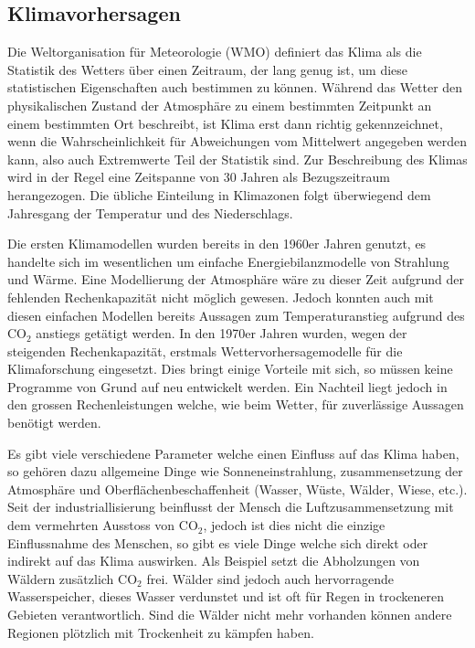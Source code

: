 \begin{refsection}
\subsection{Klimavorhersagen
\label{klima:subsection:entstehung}}
Die Weltorganisation für Meteorologie (WMO) definiert das Klima als die Statistik des Wetters über einen Zeitraum, der lang genug ist, um diese statistischen Eigenschaften auch bestimmen zu können. Während das Wetter den physikalischen Zustand der Atmosphäre zu einem bestimmten Zeitpunkt an einem bestimmten Ort beschreibt, ist Klima erst dann richtig gekennzeichnet, wenn die Wahrscheinlichkeit für Abweichungen vom Mittelwert angegeben werden kann, also auch Extremwerte Teil der Statistik sind. Zur Beschreibung des Klimas wird in der Regel eine Zeitspanne von 30 Jahren als Bezugszeitraum herangezogen. Die übliche Einteilung in Klimazonen folgt überwiegend dem Jahresgang der Temperatur und des Niederschlags. \cite{klima:maxplanck}

Die ersten Klimamodellen wurden bereits in den 1960er Jahren genutzt, es handelte sich im wesentlichen um einfache Energiebilanzmodelle von Strahlung und Wärme. Eine Modellierung der Atmosphäre wäre zu dieser Zeit aufgrund der fehlenden Rechenkapazität nicht möglich gewesen. Jedoch konnten auch mit diesen einfachen Modellen bereits Aussagen zum Temperaturanstieg aufgrund des CO$_2$ anstiegs getätigt werden. In den 1970er Jahren wurden, wegen der steigenden Rechenkapazität, erstmals Wettervorhersagemodelle für die Klimaforschung eingesetzt. Dies bringt einige Vorteile mit sich, so müssen keine Programme von Grund auf neu entwickelt werden. Ein Nachteil liegt jedoch in den grossen Rechenleistungen welche, wie beim Wetter, für zuverlässige Aussagen benötigt werden.
 
Es gibt viele verschiedene Parameter welche einen Einfluss auf das Klima haben, so gehören dazu  allgemeine Dinge wie Sonneneinstrahlung, zusammensetzung der Atmosphäre und Oberflächenbeschaffenheit (Wasser, Wüste, Wälder, Wiese, etc.). Seit der industriallisierung beinflusst der Mensch die Luftzusammensetzung mit dem vermehrten Ausstoss von CO$_2$, jedoch ist dies nicht die einzige Einflussnahme des Menschen, so gibt es viele Dinge welche sich direkt oder indirekt auf das Klima auswirken. Als Beispiel setzt die Abholzungen von Wäldern zusätzlich CO$_2$ frei. Wälder sind jedoch auch hervorragende Wasserspeicher, dieses Wasser verdunstet und ist oft für Regen in trockeneren Gebieten verantwortlich. Sind die Wälder nicht mehr vorhanden können andere Regionen plötzlich mit Trockenheit zu kämpfen haben.


\end{refsection}
